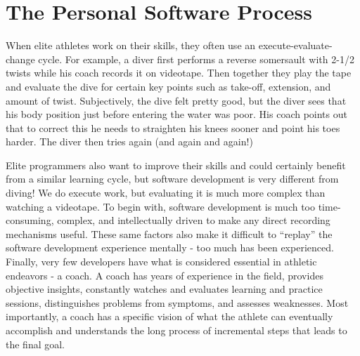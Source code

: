 \chapter{The Personal Software Process}

When elite athletes work on their skills, they often use an
execute-evaluate-change cycle.  For example, a diver first performs a
reverse somersault with 2-1/2 twists while his coach records it on
videotape.  Then together they play the tape and evaluate the dive for
certain key points such as take-off, extension, and amount of twist.
Subjectively, the dive felt pretty good, but the diver sees that his body
position just before entering the water was poor.  His coach points out
that to correct this he needs to straighten his knees sooner and point his
toes harder.  The diver then tries again (and again and again!)

Elite programmers also want to improve their skills and could certainly
benefit from a similar learning cycle, but software development is very
different from diving!  We do execute work, but evaluating it is much more
complex than watching a videotape. To begin with, software development is
much too time-consuming, complex, and intellectually driven to make any
direct recording mechanisms useful.  These same factors also make it
difficult to ``replay'' the software development experience mentally - too
much has been experienced.  Finally, very few developers have what is
considered essential in athletic endeavors - a coach.  A coach has years of
experience in the field, provides objective insights, constantly watches
and evaluates learning and practice sessions, distinguishes problems from
symptoms, and assesses weaknesses.  Most importantly, a coach has a
specific vision of what the athlete can eventually accomplish and
understands the long process of incremental steps that leads to the final
goal.

